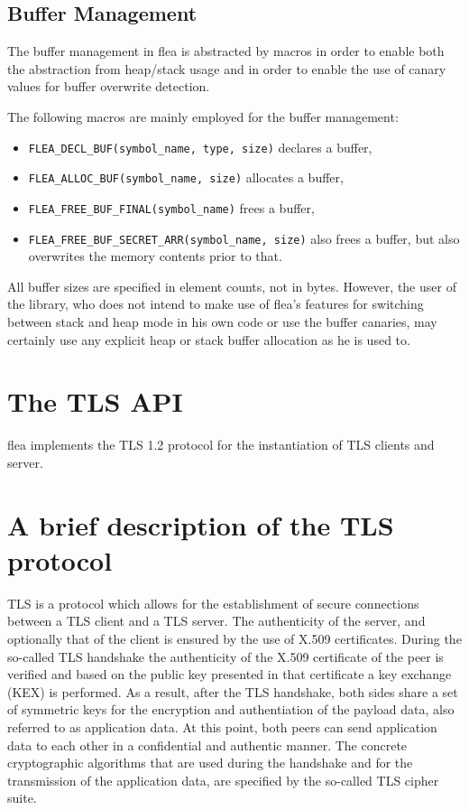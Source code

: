 \documentclass[a4paper,11pt]{scrartcl}
\begin{document}
\subsection{Buffer Management}
The buffer management in flea is abstracted by macros in order to enable both
the abstraction from heap/stack usage and in order to enable the use of canary
values for buffer overwrite detection.

The following  macros are mainly employed for the buffer management:
\begin{itemize}
  \item \verb#FLEA_DECL_BUF(symbol_name, type, size)# declares a buffer, 
  \item \verb#FLEA_ALLOC_BUF(symbol_name, size)# allocates a buffer, 
  \item \verb#FLEA_FREE_BUF_FINAL(symbol_name)# frees a buffer,
  \item \verb#FLEA_FREE_BUF_SECRET_ARR(symbol_name, size)# also frees a buffer,
    but also overwrites the memory contents prior to that.
\end{itemize}
All buffer sizes are specified in element counts, not in bytes. However, the
user of the library, who does not intend to make use of flea's features for 
switching between stack and heap mode in his own code or use the buffer
canaries, may certainly use any explicit heap or stack buffer allocation as he
is used to.



\section{The TLS API}

flea implements the TLS 1.2 protocol for the instantiation of TLS clients and
server. 

\section{A brief description of the TLS protocol}
TLS is a protocol which allows for the establishment of secure connections
between a TLS client and a TLS server. The authenticity of the server, and
optionally that of the client is ensured by the use of X.509 certificates.
During the so-called TLS handshake the authenticity of the X.509 certificate of
the peer is verified and based on the public key presented in that certificate
a key exchange (KEX) is performed. As a result, after the TLS handshake, both
sides share a set of symmetric keys for the encryption and authentiation of the
payload data, also referred to as application data. 
At this point, both peers
can send application data to each other in a confidential and authentic manner.
The concrete cryptographic algorithms that are used during the handshake and for the
transmission of the application data, are specified by the so-called TLS
cipher suite.
\end{document}
